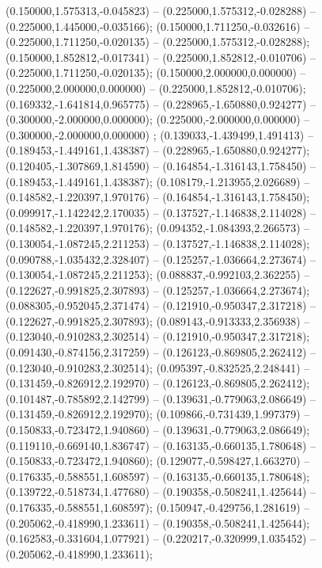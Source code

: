  (0.150000,1.575313,-0.045823) -- (0.225000,1.575312,-0.028288) -- (0.225000,1.445000,-0.035166);
 (0.150000,1.711250,-0.032616) -- (0.225000,1.711250,-0.020135) -- (0.225000,1.575312,-0.028288);
 (0.150000,1.852812,-0.017341) -- (0.225000,1.852812,-0.010706) -- (0.225000,1.711250,-0.020135);
 (0.150000,2.000000,0.000000) -- (0.225000,2.000000,0.000000) -- (0.225000,1.852812,-0.010706);
 (0.169332,-1.641814,0.965775) -- (0.228965,-1.650880,0.924277) -- (0.300000,-2.000000,0.000000);
 (0.225000,-2.000000,0.000000) -- (0.300000,-2.000000,0.000000) ;
 (0.139033,-1.439499,1.491413) -- (0.189453,-1.449161,1.438387) -- (0.228965,-1.650880,0.924277);
 (0.120405,-1.307869,1.814590) -- (0.164854,-1.316143,1.758450) -- (0.189453,-1.449161,1.438387);
 (0.108179,-1.213955,2.026689) -- (0.148582,-1.220397,1.970176) -- (0.164854,-1.316143,1.758450);
 (0.099917,-1.142242,2.170035) -- (0.137527,-1.146838,2.114028) -- (0.148582,-1.220397,1.970176);
 (0.094352,-1.084393,2.266573) -- (0.130054,-1.087245,2.211253) -- (0.137527,-1.146838,2.114028);
 (0.090788,-1.035432,2.328407) -- (0.125257,-1.036664,2.273674) -- (0.130054,-1.087245,2.211253);
 (0.088837,-0.992103,2.362255) -- (0.122627,-0.991825,2.307893) -- (0.125257,-1.036664,2.273674);
 (0.088305,-0.952045,2.371474) -- (0.121910,-0.950347,2.317218) -- (0.122627,-0.991825,2.307893);
 (0.089143,-0.913333,2.356938) -- (0.123040,-0.910283,2.302514) -- (0.121910,-0.950347,2.317218);
 (0.091430,-0.874156,2.317259) -- (0.126123,-0.869805,2.262412) -- (0.123040,-0.910283,2.302514);
 (0.095397,-0.832525,2.248441) -- (0.131459,-0.826912,2.192970) -- (0.126123,-0.869805,2.262412);
 (0.101487,-0.785892,2.142799) -- (0.139631,-0.779063,2.086649) -- (0.131459,-0.826912,2.192970);
 (0.109866,-0.731439,1.997379) -- (0.150833,-0.723472,1.940860) -- (0.139631,-0.779063,2.086649);
 (0.119110,-0.669140,1.836747) -- (0.163135,-0.660135,1.780648) -- (0.150833,-0.723472,1.940860);
 (0.129077,-0.598427,1.663270) -- (0.176335,-0.588551,1.608597) -- (0.163135,-0.660135,1.780648);
 (0.139722,-0.518734,1.477680) -- (0.190358,-0.508241,1.425644) -- (0.176335,-0.588551,1.608597);
 (0.150947,-0.429756,1.281619) -- (0.205062,-0.418990,1.233611) -- (0.190358,-0.508241,1.425644);
 (0.162583,-0.331604,1.077921) -- (0.220217,-0.320999,1.035452) -- (0.205062,-0.418990,1.233611);
